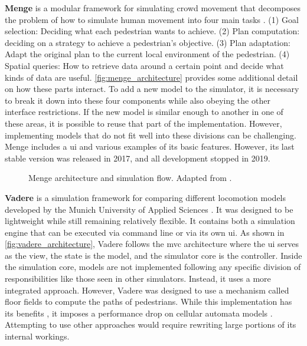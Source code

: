 \documentclass[twoside, 11pt]{article}
\begin{document}
\textbf{Menge} is a modular framework for simulating crowd movement that decomposes the problem of how to simulate human movement into four main tasks \cite{curtisMengeModularFramework2016}. (1) Goal selection: Deciding what each pedestrian wants to achieve. (2) Plan computation: deciding on a strategy to achieve a pedestrian's objective. (3) Plan adaptation: Adapt the original plan to the current local environment of the pedestrian. (4) Spatial queries: How to retrieve data around a certain point and decide what kinds of data are useful. \autoref{fig:menge_architecture} provides some additional detail on how these parts interact. To add a new model to the simulator, it is necessary to break it down into these four components while also obeying the other interface restrictions. If the new model is similar enough to another in one of these areas, it is possible to reuse that part of the implementation. However, implementing models that do not fit well into these divisions can be challenging. Menge includes a \gls{ui} and various examples of its basic features. However, its last stable version was released in 2017, and all development stopped in 2019.

\begin{figure}[h]
  \centering
  
  \caption[Menge architecture and simulation flow]{Menge architecture and simulation flow. Adapted from \cite{curtisMengeModularFramework2016}.}
  \label{fig:menge_architecture}
\end{figure}


\textbf{Vadere} is a simulation framework for comparing different locomotion models developed by the Munich University of Applied Sciences \cite{kleinmeierVadereOpenSourceSimulation2019}. It was designed to be lightweight while still remaining relatively flexible. It contains both a simulation engine that can be executed via command line or via its own \gls{ui}. As shown in \autoref{fig:vadere_architecture}, Vadere follows the \gls{mvc} architecture where the \gls{ui} serves as the view, the state is the model, and the simulator core is the controller. Inside the simulation core, models are not implemented following any specific division of responsibilities like those seen in other simulators. Instead, it uses a more integrated approach. However, Vadere was designed to use a mechanism called floor fields to compute the paths of pedestrians. While this implementation has its benefits \cite{seitzSuperpositionPrincipleConceptual2016}, it imposes a performance drop on cellular automata models \cite{kleinmeierVadereOpenSourceSimulation2019}. Attempting to use other approaches would require rewriting large portions of its internal workings.
\end{document}
